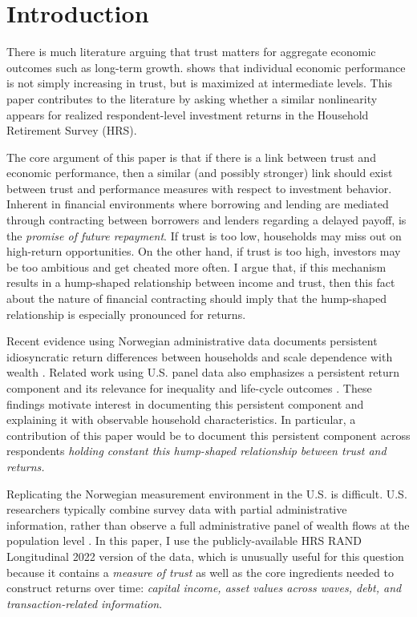 \onlyinsubfile{\setcounter{section}{0}}
\section{Introduction}
\label{sec:chapter2-intro}

\par There is much literature \parencite{Algan2010} arguing that trust matters for aggregate economic outcomes such as long-term growth. \cite{jbpglg2016} shows that individual economic performance is not simply increasing in trust, but is maximized at intermediate levels. This paper contributes to the literature by asking whether a similar nonlinearity appears for realized respondent-level investment returns in the Household Retirement Survey (HRS).

\par The core argument of this paper is that if there is a link between trust and economic performance, then a similar (and possibly stronger) link should exist between trust and performance measures with respect to investment behavior. Inherent in financial environments where borrowing and lending are mediated through contracting between borrowers and lenders regarding a delayed payoff, is the \textit{promise of future repayment}. If trust is too low, households may miss out on high-return opportunities. On the other hand, if trust is too high, investors may be too ambitious and get cheated more often. I argue that, if this  mechanism results in a hump-shaped relationship between income and trust, then this fact about the nature of financial contracting should imply that the hump-shaped relationship is especially pronounced for returns. 

\par  Recent evidence using Norwegian administrative data documents persistent idiosyncratic return differences between households and scale dependence with wealth \cite{aflgdmlp20}. Related work using U.S. panel data also emphasizes a persistent return component and its relevance for inequality and life-cycle outcomes \cite{Daminato2024}. These findings motivate interest in documenting this persistent component and explaining it with observable household characteristics. In particular, a contribution of this paper would be to document this persistent component across respondents \textit{holding constant this hump-shaped relationship between trust and returns.}

\par Replicating the Norwegian measurement environment in the U.S. is difficult. U.S. researchers typically combine survey data with partial administrative information, rather than observe a full administrative panel of wealth flows at the population level \cite{Kennickell2017b}. In this paper, I use the publicly-available HRS RAND Longitudinal 2022 version of the data, which is unusually useful for this question because it contains a \textit{measure of trust} as well as the core ingredients needed to construct returns over time: \textit{capital income, asset values across waves, debt, and transaction-related information}.

